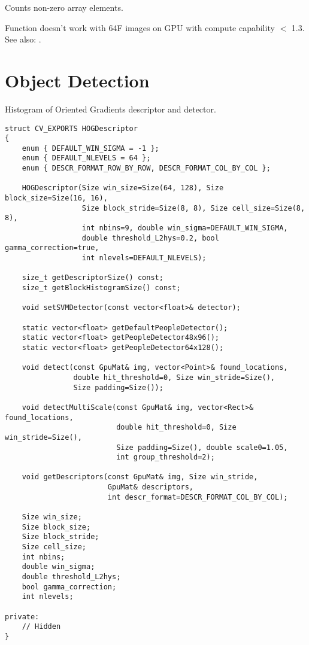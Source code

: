 Counts non-zero array elements.

\begin{description}
\end{description}

Function doesn't work with 64F images on GPU with compute capability $<$ 1.3.\newline
See also: .


\section{Object Detection}


Histogram of Oriented Gradients descriptor and detector.

\begin{lstlisting}
struct CV_EXPORTS HOGDescriptor
{
    enum { DEFAULT_WIN_SIGMA = -1 };
    enum { DEFAULT_NLEVELS = 64 };
    enum { DESCR_FORMAT_ROW_BY_ROW, DESCR_FORMAT_COL_BY_COL };

    HOGDescriptor(Size win_size=Size(64, 128), Size block_size=Size(16, 16),
                  Size block_stride=Size(8, 8), Size cell_size=Size(8, 8),
                  int nbins=9, double win_sigma=DEFAULT_WIN_SIGMA,
                  double threshold_L2hys=0.2, bool gamma_correction=true,
                  int nlevels=DEFAULT_NLEVELS);

    size_t getDescriptorSize() const;
    size_t getBlockHistogramSize() const;

    void setSVMDetector(const vector<float>& detector);

    static vector<float> getDefaultPeopleDetector();
    static vector<float> getPeopleDetector48x96();
    static vector<float> getPeopleDetector64x128();

    void detect(const GpuMat& img, vector<Point>& found_locations, 
                double hit_threshold=0, Size win_stride=Size(), 
                Size padding=Size());

    void detectMultiScale(const GpuMat& img, vector<Rect>& found_locations,
                          double hit_threshold=0, Size win_stride=Size(), 
                          Size padding=Size(), double scale0=1.05, 
                          int group_threshold=2);

    void getDescriptors(const GpuMat& img, Size win_stride, 
                        GpuMat& descriptors,
                        int descr_format=DESCR_FORMAT_COL_BY_COL);

    Size win_size;
    Size block_size;
    Size block_stride;
    Size cell_size;
    int nbins;
    double win_sigma;
    double threshold_L2hys;
    bool gamma_correction;
    int nlevels;

private:
    // Hidden
}
\end{lstlisting}

